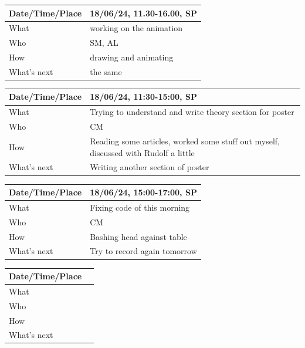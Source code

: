 \documentclass{article}
\begin{document}
\begin{table}[H]
\begin{tabular}{|p{1.5in}|p{4in}|}
\hline
Date/Time/Place & 18/06/24, 11.30-16.00, SP\\ \hline
What            &  working on the animation\\ \hline
Who             &  SM, AL\\ \hline
How             &  drawing and animating\\ \hline
What's next     &  the same\\ \hline
\end{tabular}
\end{table}

\begin{table}[H]
\begin{tabular}{|p{1.5in}|p{4in}|}
\hline
Date/Time/Place &  18/06/24, 11:30-15:00, SP\\ \hline
What            &  Trying to understand and write theory section for poster\\ \hline
Who             &  CM\\ \hline
How             &  Reading some articles, worked some stuff out myself, discussed with Rudolf a little\\ \hline
What's next     &  Writing another section of poster\\ \hline
\end{tabular}
\end{table}

\begin{table}[H]
\begin{tabular}{|p{1.5in}|p{4in}|}
\hline
Date/Time/Place &  18/06/24, 15:00-17:00, SP\\ \hline
What            &  Fixing code of this morning\\ \hline
Who             &  CM\\ \hline
How             &  Bashing head against table\\ \hline
What's next     &  Try to record again tomorrow\\ \hline
\end{tabular}
\end{table}

\begin{table}[H]
\begin{tabular}{|p{1.5in}|p{4in}|}
\hline
Date/Time/Place &  \\ \hline
What            &  \\ \hline
Who             &  \\ \hline
How             &  \\ \hline
What's next     &  \\ \hline
\end{tabular}
\end{table}
\end{document}
